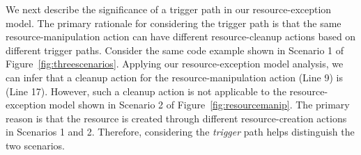 We next describe the significance of a trigger path in our resource-exception model.
The primary rationale for considering the trigger path is that the same resource-manipulation
action can have different resource-cleanup actions based on different trigger paths.
Consider the same code example shown in Scenario 1 of Figure~\ref{fig:threescenarios}. Applying our
resource-exception model analysis, we can infer that a cleanup action for
the resource-manipulation action  
(Line 9) is  (Line 17).
However, such a cleanup action is not applicable to the resource-exception model
shown in Scenario 2 of Figure~\ref{fig:resourcemanip}. The primary reason is that the 
resource is created through different resource-creation actions in Scenarios 1 and 2. Therefore,
considering the \emph{trigger} path helps distinguish the two scenarios.

